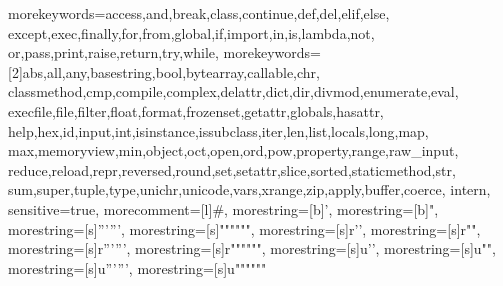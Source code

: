 %
  {morekeywords={access,and,break,class,continue,def,del,elif,else,%
      except,exec,finally,for,from,global,if,import,in,is,lambda,not,%
      or,pass,print,raise,return,try,while},%
   morekeywords=[2]{abs,all,any,basestring,bool,bytearray,callable,chr,
     classmethod,cmp,compile,complex,delattr,dict,dir,divmod,enumerate,eval,
     execfile,file,filter,float,format,frozenset,getattr,globals,hasattr,
     help,hex,id,input,int,isinstance,issubclass,iter,len,list,locals,long,map,
     max,memoryview,min,object,oct,open,ord,pow,property,range,raw_input,
     reduce,reload,repr,reversed,round,set,setattr,slice,sorted,staticmethod,str,
     sum,super,tuple,type,unichr,unicode,vars,xrange,zip,apply,buffer,coerce,
     intern},
   sensitive=true,%
   morecomment=[l]\#,%
   morestring=[b]',%
   morestring=[b]",%
   morestring=[s]{'''}{'''},%
   morestring=[s]{"""}{"""},%
   morestring=[s]{r'}{'},%
   morestring=[s]{r"}{"},%
   morestring=[s]{r'''}{'''},%
   morestring=[s]{r"""}{"""},%
   morestring=[s]{u'}{'},%
   morestring=[s]{u"}{"},%
   morestring=[s]{u'''}{'''},%
   morestring=[s]{u"""}{"""}%
  }%

